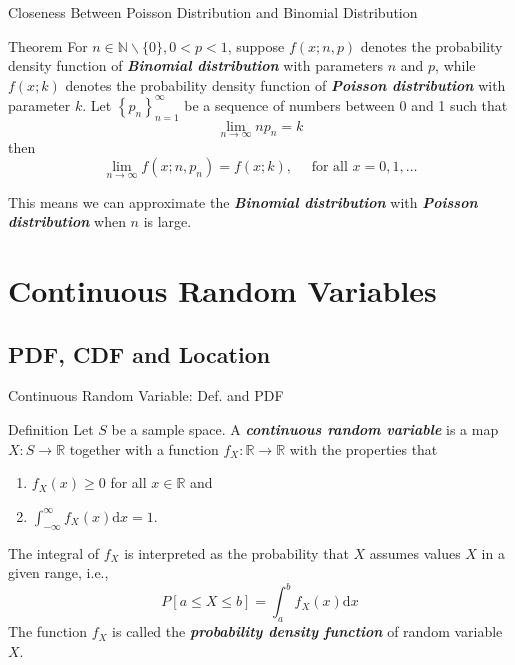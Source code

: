 \documentclass{beamer}
\newcommand{\bb}[1]{\textcolor{antiquefuchsia}{\textbf{\textit{#1}}}}
\begin{document}
\begin{frame}{Closeness Between Poisson Distribution and Binomial Distribution}
\begin{block}{Theorem}
For $n \in \mathbb{N} \backslash\{0\}, 0<p<1$, suppose $f(x ; n, p)$ denotes the probability density function of \bb{Binomial distribution} with parameters $n$ and $p$, while $f(x ; k)$ denotes the probability density function of \bb{Poisson distribution} with parameter $k$. Let $\left\{p_{n}\right\}_{n=1}^{\infty}$ be a sequence of numbers between 0 and 1 such that
$$
\lim _{n \rightarrow \infty} n p_{n}=k
$$
then
$$
\lim _{n \rightarrow \infty} f\left(x ; n, p_{n}\right)=f(x ; k), \quad \text { for all } x=0,1, \ldots
$$
\end{block}
This means we can approximate the \bb{Binomial distribution} with \bb{Poisson distribution} when $n$ is large.
\end{frame}

\section{Continuous Random Variables}
\subsection{PDF, CDF and Location}
\begin{frame}{Continuous Random Variable: Def. and PDF}
\begin{block}{Definition}
Let $S$ be a sample space. A \bb{continuous random variable} is a map $X: S \rightarrow \mathbb{R}$ together with a function $f_{X}: \mathbb{R} \rightarrow \mathbb{R}$ with the properties that
\begin{enumerate}
\item $f_{X}(x) \geq 0$ for all $x \in \mathbb{R}$ and
\item $\int_{-\infty}^{\infty} f_{X}(x) \mathrm{d} x=1$.
\end{enumerate}
The integral of $f_{X}$ is interpreted as the probability that $X$ assumes values $X$ in a given range, i.e.,
$$
P[a \leq X \leq b]=\int_{a}^{b} f_{X}(x) \mathrm{d} x
$$
The function $f_{X}$ is called the \bb{probability density function} of random variable $X$.
\end{block}
\end{frame}
\end{document}
